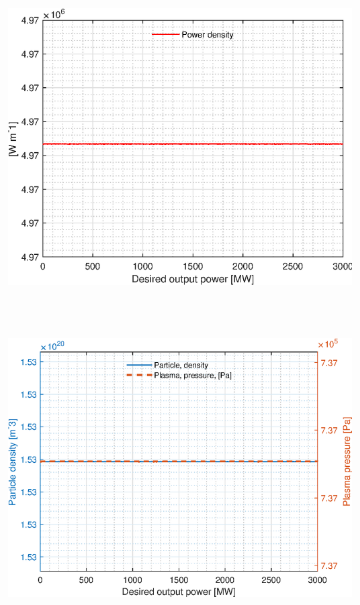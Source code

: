 \begin{figure}[H]
	\begin{subfigure}[h!]{.45\textwidth}
		\includegraphics[width=\textwidth]{MatlabFigures/PE/f5.eps}
	\end{subfigure}
	~
	\begin{subfigure}[h!]{.45\textwidth}
		\includegraphics[width=\textwidth]{MatlabFigures/PE/f6.eps}
	\end{subfigure}


\end{figure}
